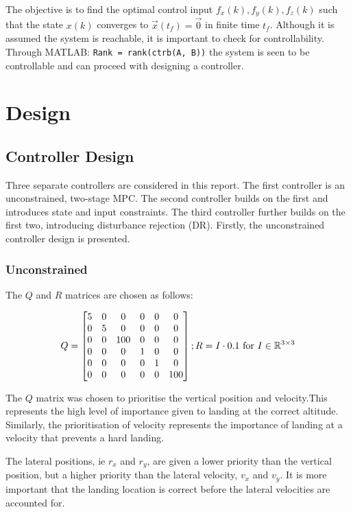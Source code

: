\documentclass[conference, tikz]{IEEEtran}
\begin{document}
The objective is to find the optimal control input $f_x(k), f_y(k), f_z(k)$ such that the state $x(k)$ converges to $\vec x(t_f)=\vec{0}$ in finite time $t_f$. Although it is assumed the system is reachable, it is important to check for controllability. 
Through MATLAB: \verb|Rank = rank(ctrb(A, B))| the system is seen to be controllable and can proceed with designing a controller. 

\section{Design}

\subsection{Controller Design}
Three separate controllers are considered in this report. 
The first controller is an unconstrained, two-stage MPC. The second controller builds on the first and introduces state and input constraints. The third controller further builds on the first two, introducing disturbance rejection (DR).
Firstly, the unconstrained controller design is presented.

\subsubsection{Unconstrained}
The $Q$ and $R$ matrices are chosen as follows:

\[
    Q = \begin{bmatrix}
        5&0&0&0&0&0 \\
        0&5&0&0&0&0 \\
        0&0&100&0&0&0 \\
        0&0&0&1&0&0 \\
        0&0&0&0&1&0 \\
        0&0&0&0&0&100 \\
    \end{bmatrix}
    ;\\ R = I \cdot 0.1 \text{ for }  I \in \mathbb{R}^{3\times 3}
\]

The $Q$ matrix was chosen to prioritise the vertical position and velocity.This represents the high level of importance given to landing at the correct altitude. Similarly, the prioritisation of velocity represents the importance of landing at a velocity that prevents a hard landing.

The lateral positions, ie $r_x$ and $r_y$, are given a lower priority than the vertical position, but a higher priority than the lateral velocity, $v_x$ and $v_y$. It is more important that the landing location is correct before the lateral velocities are accounted for.  
\end{document}

